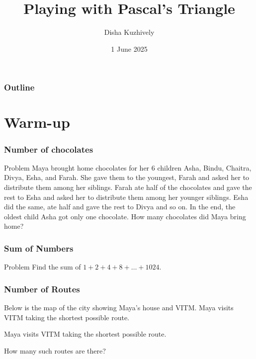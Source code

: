\documentclass{beamer}
\title{Playing with Pascal's Triangle}
\author[dishajk]{Disha Kuzhively}
\institute{ICTS-TIFR}
\date[VITM]{1 June 2025}
\begin{document}
\begin{frame}
    \titlepage
\end{frame}
\begin{frame}
    \frametitle{Outline}
    \tableofcontents[pausesections]
    \end{frame}
\section{Warm-up}
\begin{frame}
    \frametitle{Number of chocolates}
    \begin{block}{Problem}
        Maya brought home chocolates for her 6 children Asha, Bindu, Chaitra, Divya, Esha, and Farah. She gave them to the youngest, Farah and asked her to distribute them among her siblings. Farah ate half of the chocolates and gave the rest to Esha and asked her to distribute them among her younger siblings. Esha did the same, ate half and gave the rest to Divya and so on. In the end, the oldest child Asha got only one chocolate. How many chocolates did Maya bring home?
    \end{block}

\end{frame}
\begin{frame}
\frametitle{Sum of Numbers}
\begin{block}{Problem}
    Find the sum of \(1+2+4+8+\ldots+1024\).
\end{block}
\end{frame}
\begin{frame}
    \frametitle{Number of Routes}
    Below is the map of the city showing Maya's house and VITM. Maya visits VITM taking the shortest possible route.

    Maya visits VITM taking the shortest possible route.
  
    How many such routes are there?
\end{frame}
\end{document}
